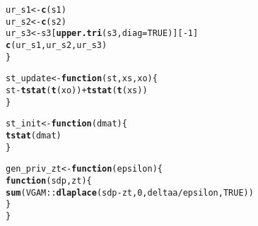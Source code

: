 \documentclass{article}\usepackage[]{graphicx}\usepackage[]{xcolor}
\makeatletter
\newcommand{\hlnum}[1]{\textcolor[rgb]{0.686,0.059,0.569}{#1}}%
\newcommand{\hlopt}[1]{\textcolor[rgb]{0,0,0}{#1}}%
\newcommand{\hlstd}[1]{\textcolor[rgb]{0.345,0.345,0.345}{#1}}%
\newcommand{\hlkwa}[1]{\textcolor[rgb]{0.161,0.373,0.58}{\textbf{#1}}}%
\newcommand{\hlkwb}[1]{\textcolor[rgb]{0.69,0.353,0.396}{#1}}%
\newcommand{\hlkwc}[1]{\textcolor[rgb]{0.333,0.667,0.333}{#1}}%
\newcommand{\hlkwd}[1]{\textcolor[rgb]{0.737,0.353,0.396}{\textbf{#1}}}%
\newenvironment{kframe}{%
 \def\at@end@of@kframe{}%
 \ifinner\ifhmode%
  \def\at@end@of@kframe{\end{minipage}}%
  \begin{minipage}{\columnwidth}%
 \fi\fi%
 \def\FrameCommand##1{\hskip\@totalleftmargin \hskip-\fboxsep
 \colorbox{shadecolor}{##1}\hskip-\fboxsep
     \hskip-\linewidth \hskip-\@totalleftmargin \hskip\columnwidth}%
 \MakeFramed {\advance\hsize-\width
   \@totalleftmargin\z@ \linewidth\hsize
   \@setminipage}}%
 {\par\unskip\endMakeFramed%
 \at@end@of@kframe}
\newenvironment{knitrout}{}{} %
\theoremstyle{definition}
\makeatother
\begin{document}
\begin{knitrout}
\begin{kframe}
\begin{alltt}
  \hlstd{ur_s1} \hlkwb{<-} \hlkwd{c}\hlstd{(s1)}
  \hlstd{ur_s2} \hlkwb{<-} \hlkwd{c}\hlstd{(s2)}
  \hlstd{ur_s3} \hlkwb{<-} \hlstd{s3[}\hlkwd{upper.tri}\hlstd{(s3,}\hlkwc{diag} \hlstd{=} \hlnum{TRUE}\hlstd{)][}\hlopt{-}\hlnum{1}\hlstd{]}
  \hlkwd{c}\hlstd{(ur_s1,ur_s2,ur_s3)}
\hlstd{\}}

\hlstd{st_update} \hlkwb{<-} \hlkwa{function}\hlstd{(}\hlkwc{st}\hlstd{,} \hlkwc{xs}\hlstd{,} \hlkwc{xo}\hlstd{) \{}
  \hlstd{st} \hlopt{-} \hlkwd{tstat}\hlstd{(}\hlkwd{t}\hlstd{(xo))} \hlopt{+} \hlkwd{tstat}\hlstd{(}\hlkwd{t}\hlstd{(xs))}
\hlstd{\}}

\hlstd{st_init} \hlkwb{<-} \hlkwa{function}\hlstd{(}\hlkwc{dmat}\hlstd{) \{}
  \hlkwd{tstat}\hlstd{(dmat)}
\hlstd{\}}


\hlstd{gen_priv_zt} \hlkwb{<-} \hlkwa{function}\hlstd{(}\hlkwc{epsilon}\hlstd{) \{}
  \hlkwa{function}\hlstd{(}\hlkwc{sdp}\hlstd{,} \hlkwc{zt}\hlstd{) \{}
    \hlkwd{sum}\hlstd{(VGAM}\hlopt{::}\hlkwd{dlaplace}\hlstd{(sdp} \hlopt{-} \hlstd{zt,} \hlnum{0}\hlstd{, deltaa}\hlopt{/}\hlstd{epsilon,} \hlnum{TRUE}\hlstd{))}
  \hlstd{\}}
\hlstd{\}}
\end{alltt}
\end{kframe}
\end{knitrout}
\end{document}
